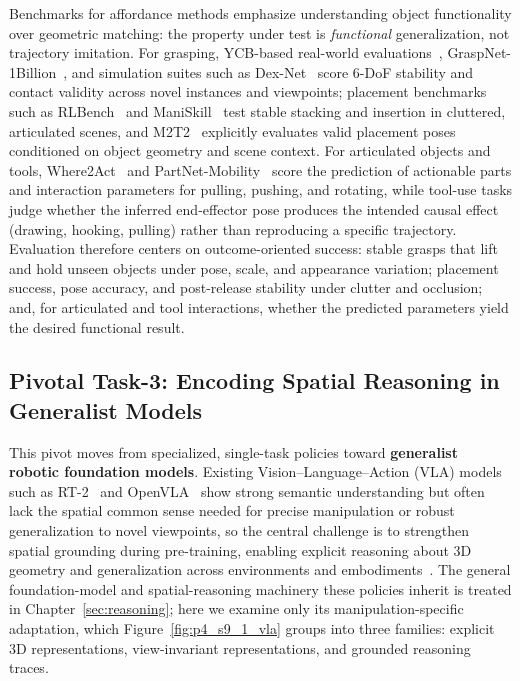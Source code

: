 Benchmarks for affordance methods emphasize understanding object functionality over geometric matching: the property under test is \emph{functional} generalization, not trajectory imitation. For grasping, YCB-based real-world evaluations~\cite{Calli2015YCB}, GraspNet-1Billion~\cite{Fang2020GraspNet}, and simulation suites such as Dex-Net~\cite{Mahler2017DexNet} score 6-DoF stability and contact validity across novel instances and viewpoints; placement benchmarks such as RLBench~\cite{james2020rlbench} and ManiSkill~\cite{mu2021maniskill} test stable stacking and insertion in cluttered, articulated scenes, and M2T2~\cite{yuan2023m2t2} explicitly evaluates valid placement poses conditioned on object geometry and scene context. For articulated objects and tools, Where2Act~\cite{mo2021where2act} and PartNet-Mobility~\cite{xiang2020sapien} score the prediction of actionable parts and interaction parameters for pulling, pushing, and rotating, while tool-use tasks judge whether the inferred end-effector pose produces the intended causal effect (drawing, hooking, pulling) rather than reproducing a specific trajectory. Evaluation therefore centers on outcome-oriented success: stable grasps that lift and hold unseen objects under pose, scale, and appearance variation; placement success, pose accuracy, and post-release stability under clutter and occlusion; and, for articulated and tool interactions, whether the predicted parameters yield the desired functional result.



\subsection{Pivotal Task-3: Encoding Spatial Reasoning in Generalist Models}
\label{subsec:p4-sec9-1-pivotal-task-3-encoding-spatial-reasoning-in-generalist-models}

This pivot moves from specialized, single-task policies toward \textbf{generalist robotic foundation models}. Existing Vision--Language--Action (VLA) models such as RT-2~\cite{zitkovich2023rt2} and OpenVLA~\cite{kim2024openvla} show strong semantic understanding but often lack the spatial common sense needed for precise manipulation or robust generalization to novel viewpoints, so the central challenge is to strengthen spatial grounding during pre-training, enabling explicit reasoning about 3D geometry and generalization across environments and embodiments~\cite{chen2024spatialvlm}. The general foundation-model and spatial-reasoning machinery these policies inherit is treated in Chapter~\ref{sec:reasoning}; here we examine only its manipulation-specific adaptation, which Figure~\ref{fig:p4_s9_1_vla} groups into three families: explicit 3D representations, view-invariant representations, and grounded reasoning traces.

